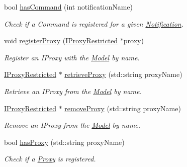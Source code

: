 \begin{DoxyCompactItemize}
bool \hyperlink{class_pure_m_v_c_1_1_facade_aee8eb006e9e5b894226558938ba807ae}{hasCommand} (int notificationName)
\begin{DoxyCompactList}\small\item\em Check if a Command is registered for a given \hyperlink{class_pure_m_v_c_1_1_notification}{Notification}. \item\end{DoxyCompactList}\item 
void \hyperlink{class_pure_m_v_c_1_1_facade_ab075d59d3da686f0262900f4e19f22cd}{registerProxy} (\hyperlink{class_pure_m_v_c_1_1_i_proxy_restricted}{IProxyRestricted} $\ast$proxy)
\begin{DoxyCompactList}\small\item\em Register an {\ttfamily IProxy} with the {\ttfamily \hyperlink{class_pure_m_v_c_1_1_model}{Model}} by name. \item\end{DoxyCompactList}\item 
\hyperlink{class_pure_m_v_c_1_1_i_proxy_restricted}{IProxyRestricted} $\ast$ \hyperlink{class_pure_m_v_c_1_1_facade_a6cba094fce77dac303714372a8bb3fc5}{retrieveProxy} (std::string proxyName)
\begin{DoxyCompactList}\small\item\em Retrieve an {\ttfamily IProxy} from the {\ttfamily \hyperlink{class_pure_m_v_c_1_1_model}{Model}} by name. \item\end{DoxyCompactList}\item 
\hyperlink{class_pure_m_v_c_1_1_i_proxy_restricted}{IProxyRestricted} $\ast$ \hyperlink{class_pure_m_v_c_1_1_facade_a2cca0e7a4b11e905c2d4f5d7e0a545c1}{removeProxy} (std::string proxyName)
\begin{DoxyCompactList}\small\item\em Remove an {\ttfamily IProxy} from the {\ttfamily \hyperlink{class_pure_m_v_c_1_1_model}{Model}} by name. \item\end{DoxyCompactList}\item 
bool \hyperlink{class_pure_m_v_c_1_1_facade_aaeac78a5ffe3d7da658761287bdccb1e}{hasProxy} (std::string proxyName)
\begin{DoxyCompactList}\small\item\em Check if a \hyperlink{class_pure_m_v_c_1_1_proxy}{Proxy} is registered. \item\end{DoxyCompactList}\item 

\end{DoxyCompactItemize}
